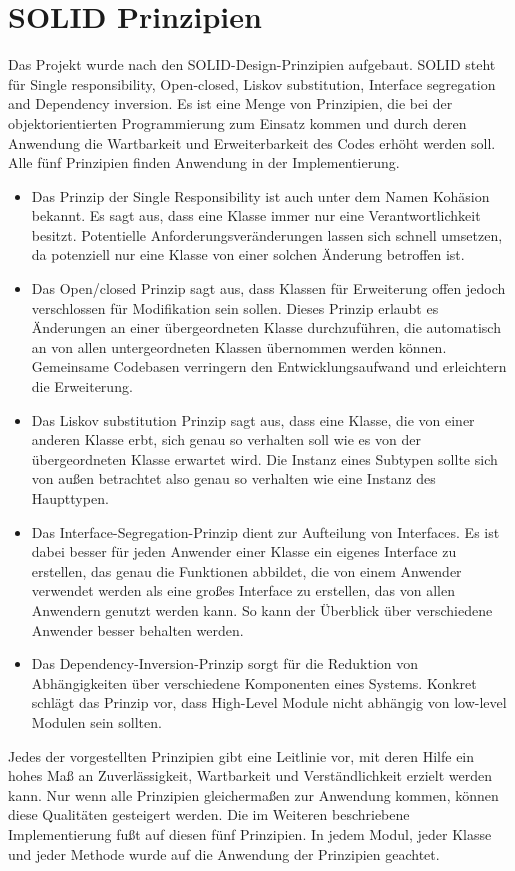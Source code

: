 \section{SOLID Prinzipien}

Das Projekt wurde nach den SOLID-Design-Prinzipien \cite{unclebob1995} aufgebaut. SOLID steht für Single responsibility, Open-closed, Liskov substitution, Interface segregation and Dependency inversion. Es ist eine Menge von Prinzipien, die bei der objektorientierten Programmierung zum Einsatz kommen und durch deren Anwendung die Wartbarkeit und Erweiterbarkeit des Codes erhöht werden soll. Alle fünf Prinzipien finden Anwendung in der Implementierung.

\begin{itemize}
\item Das Prinzip der Single Responsibility  ist auch unter dem Namen Kohäsion bekannt. Es sagt aus, dass eine Klasse immer nur eine Verantwortlichkeit besitzt.  Potentielle Anforderungsveränderungen lassen sich schnell umsetzen, da potenziell nur eine Klasse von einer solchen Änderung betroffen ist.

\item Das Open/closed Prinzip sagt aus, dass Klassen für Erweiterung offen jedoch verschlossen für Modifikation sein sollen. Dieses Prinzip erlaubt es Änderungen an einer übergeordneten Klasse durchzuführen, die automatisch an von allen untergeordneten Klassen übernommen werden können. Gemeinsame Codebasen verringern den Entwicklungsaufwand und erleichtern die Erweiterung.

\item Das Liskov substitution Prinzip sagt aus, dass eine Klasse, die von einer anderen Klasse erbt, sich genau so verhalten soll wie es von der übergeordneten Klasse erwartet wird. Die Instanz eines Subtypen sollte sich von außen betrachtet also genau so verhalten wie eine Instanz des Haupttypen.

\item Das Interface-Segregation-Prinzip dient zur Aufteilung von Interfaces. Es ist dabei besser für jeden Anwender einer Klasse ein eigenes Interface zu erstellen, das genau die Funktionen abbildet, die von einem Anwender verwendet werden als eine großes Interface zu erstellen, das von allen Anwendern genutzt werden kann. So kann der Überblick über verschiedene Anwender besser behalten werden.

\item Das Dependency-Inversion-Prinzip sorgt für die Reduktion von Abhängigkeiten über verschiedene Komponenten eines Systems. Konkret schlägt das Prinzip vor, dass High-Level Module nicht abhängig von low-level Modulen sein sollten.

\end{itemize}

Jedes der vorgestellten Prinzipien gibt eine Leitlinie vor, mit deren Hilfe ein hohes Maß an Zuverlässigkeit, Wartbarkeit und Verständlichkeit erzielt werden kann. Nur wenn alle Prinzipien gleichermaßen zur Anwendung kommen, können diese Qualitäten gesteigert werden. Die im Weiteren beschriebene Implementierung fußt auf diesen fünf Prinzipien. In jedem Modul, jeder Klasse und jeder Methode wurde auf die Anwendung der Prinzipien geachtet.